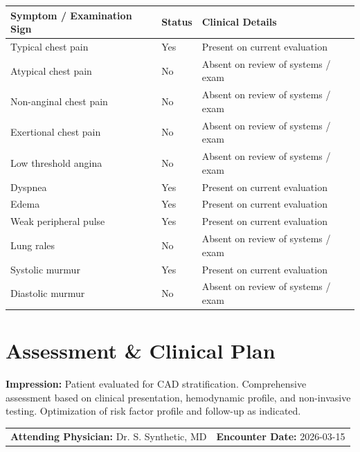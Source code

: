\documentclass[10pt,a4paper]{article}
\begin{document}
\begin{tabular}{@{} p{6.8cm} p{2.8cm} p{5.5cm} @{}}
  \toprule
  \textbf{Symptom / Examination Sign} & \textbf{Status} & \textbf{Clinical Details} \\
  \midrule
  Typical chest pain & Yes & Present on current evaluation \\
  Atypical chest pain & No & Absent on review of systems / exam \\
  Non-anginal chest pain & No & Absent on review of systems / exam \\
  Exertional chest pain & No & Absent on review of systems / exam \\
  Low threshold angina & No & Absent on review of systems / exam \\
  Dyspnea & Yes & Present on current evaluation \\
  Edema & Yes & Present on current evaluation \\
  Weak peripheral pulse & Yes & Present on current evaluation \\
  Lung rales & No & Absent on review of systems / exam \\
  Systolic murmur & Yes & Present on current evaluation \\
  Diastolic murmur & No & Absent on review of systems / exam \\
  \bottomrule
\end{tabular}

\vspace{8pt}

\section*{Assessment \& Clinical Plan}

\noindent
\textbf{Impression:} Patient evaluated for CAD stratification. Comprehensive assessment based on clinical presentation, hemodynamic profile, and non-invasive testing. Optimization of risk factor profile and follow-up as indicated.

\vspace{14pt}

\noindent
\begin{tabular*}{\textwidth}{@{} l @{\extracolsep{\fill}} r @{}}
  \textbf{Attending Physician:} Dr. S. Synthetic, MD & \textbf{Encounter Date:} 2026-03-15 \\
\end{tabular*}
\end{document}

